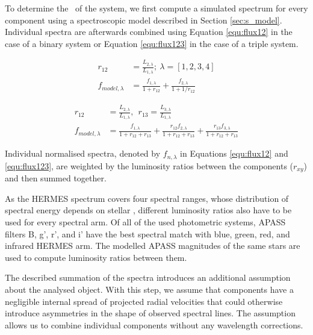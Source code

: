 To determine the \Feh\ of the system, we first compute a simulated spectrum for every component using a spectroscopic model described in Section \ref{sec:s_model}. Individual spectra are afterwards combined using Equation \ref{equ:flux12} in the case of a binary system or Equation \ref{equ:flux123} in the case of a triple system. 

\begin{equation}
	\label{equ:flux12}
	\begin{aligned}  %
	r_{12} &= \frac{L_{2,\lambda}}{L_{1,\lambda}}; \ \lambda=[1, 2, 3, 4]\\ 
	f_{model,\lambda} &= \frac{f_{1,\lambda}}{1+r_{12}} + \frac{f_{2,\lambda}}{1+1/r_{12}}
	\end{aligned}
\end{equation}

\begin{equation}
	\label{equ:flux123}
	\begin{aligned}
	r_{12} &= \frac{L_{2,\lambda}}{L_{1,\lambda}},\ \ r_{13} = \frac{L_{3,\lambda}}{L_{1,\lambda}}\\ 
	f_{model,\lambda} &= \frac{f_{1,\lambda}}{1 + r_{12} + r_{13}} + \frac{r_{12} f_{2,\lambda}}{1 + r_{12} + r_{13}} + \frac{r_{13} f_{3,\lambda}}{1 + r_{12} + r_{13}}
	\end{aligned}
\end{equation}

Individual normalised spectra, denoted by $f_{n,\lambda}$ in Equations \ref{equ:flux12} and \ref{equ:flux123}, are weighted by the luminosity ratios between the components ($r_{xy}$) and then summed together. 

As the HERMES spectrum covers four spectral ranges, whose distribution of spectral energy depends on stellar \Teff, different luminosity ratios also have to be used for every spectral arm. Of all of the used photometric systems, APASS filters B, g', r', and i' have the best spectral match with blue, green, red, and infrared HERMES arm. The modelled APASS magnitudes of the same stars are used to compute luminosity ratios between them.

The described summation of the spectra introduces an additional assumption about the analysed object. With this step, we assume that components have a negligible internal spread of projected radial velocities that could otherwise introduce asymmetries in the shape of observed spectral lines. The assumption allows us to combine individual components without any wavelength corrections.

